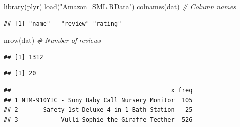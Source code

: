\documentclass[
]{article}
\newenvironment{Shaded}{\begin{snugshade}}{\end{snugshade}}
\newcommand{\CommentTok}[1]{\textcolor[rgb]{0.56,0.35,0.01}{\textit{#1}}}
\newcommand{\DecValTok}[1]{\textcolor[rgb]{0.00,0.00,0.81}{#1}}
\newcommand{\FunctionTok}[1]{\textcolor[rgb]{0.00,0.00,0.00}{#1}}
\newcommand{\NormalTok}[1]{#1}
\newcommand{\OtherTok}[1]{\textcolor[rgb]{0.56,0.35,0.01}{#1}}
\newcommand{\SpecialCharTok}[1]{\textcolor[rgb]{0.00,0.00,0.00}{#1}}
\newcommand{\StringTok}[1]{\textcolor[rgb]{0.31,0.60,0.02}{#1}}
\begin{document}
\begin{Shaded}
\begin{Highlighting}[]
\FunctionTok{library}\NormalTok{(plyr)}
\FunctionTok{load}\NormalTok{(}\StringTok{"Amazon\_SML.RData"}\NormalTok{)}
\FunctionTok{colnames}\NormalTok{(dat) }\CommentTok{\# Column names}
\end{Highlighting}
\end{Shaded}

\begin{verbatim}
## [1] "name"   "review" "rating"
\end{verbatim}

\begin{Shaded}
\begin{Highlighting}[]
\FunctionTok{nrow}\NormalTok{(dat) }\CommentTok{\# Number of reviews}
\end{Highlighting}
\end{Shaded}

\begin{verbatim}
## [1] 1312
\end{verbatim}

\begin{Shaded}
\end{Shaded}

\begin{verbatim}
## [1] 20
\end{verbatim}

\begin{Shaded}
\end{Shaded}

\begin{verbatim}
##                                             x freq
## 1 NTM-910YIC - Sony Baby Call Nursery Monitor  105
## 2       Safety 1st Deluxe 4-in-1 Bath Station   25
## 3            Vulli Sophie the Giraffe Teether  526
\end{verbatim}
\end{document}
